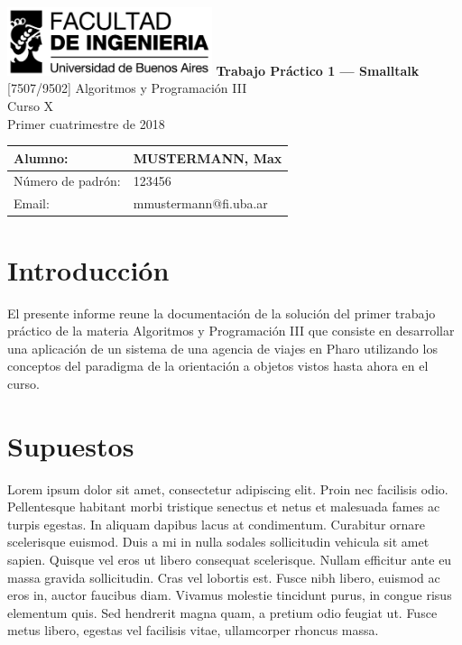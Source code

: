 \documentclass[titlepage,a4paper]{article}
\begin{document}
\begin{titlepage} %
	\hfill\includegraphics[width=6cm]{logofiuba.jpg}
    \centering
    \vfill
    \Huge \textbf{Trabajo Práctico 1 — Smalltalk}
    \vskip2cm
    \Large [7507/9502] Algoritmos y Programación III\\
    Curso X \\ %
    Primer cuatrimestre de 2018 
    \vfill
    \begin{tabular}{ | l | l | } %
      \hline
      Alumno: & MUSTERMANN, Max \\ \hline
      Número de padrón: & 123456 \\ \hline
      Email: & mmustermann@fi.uba.ar \\ \hline
  	\end{tabular}
    \vfill
    \vfill
\end{titlepage}

\tableofcontents %
\newpage

\section{Introducción}\label{sec:intro}
El presente informe reune la documentación de la solución del primer trabajo práctico de la materia Algoritmos y Programación III que consiste en desarrollar una aplicación de un sistema de una agencia de viajes en Pharo utilizando los conceptos del paradigma de la orientación a objetos vistos hasta ahora en el curso.

\section{Supuestos}\label{sec:supuestos}

Lorem ipsum dolor sit amet, consectetur adipiscing elit. Proin nec facilisis odio. Pellentesque habitant morbi tristique senectus et netus et malesuada fames ac turpis egestas. In aliquam dapibus lacus at condimentum. Curabitur ornare scelerisque euismod. Duis a mi in nulla sodales sollicitudin vehicula sit amet sapien. Quisque vel eros ut libero consequat scelerisque. Nullam efficitur ante eu massa gravida sollicitudin. Cras vel lobortis est. Fusce nibh libero, euismod ac eros in, auctor faucibus diam. Vivamus molestie tincidunt purus, in congue risus elementum quis. Sed hendrerit magna quam, a pretium odio feugiat ut. Fusce metus libero, egestas vel facilisis vitae, ullamcorper rhoncus massa.
\end{document}
